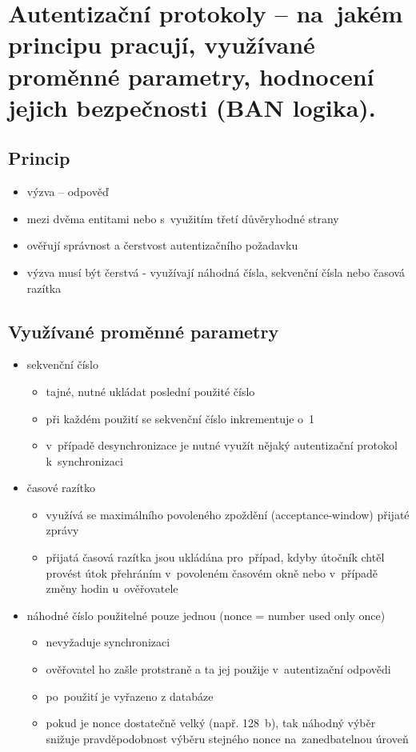 \clearpage
\section{Autentizační protokoly -- na~jakém principu pracují, využívané proměnné parametry, hodnocení jejich bezpečnosti (BAN logika).}

\subsection{Princip}
\begin{itemize}
    \item výzva -- odpověď
    \item mezi dvěma entitami nebo s~využitím třetí důvěryhodné strany
    \item ověřují správnost a čerstvost autentizačního požadavku
    \item výzva musí být čerstvá - využívají náhodná čísla, sekvenční čísla nebo časová razítka
\end{itemize}

\subsection{Využívané proměnné parametry}
\begin{itemize}
    \item sekvenční číslo
    \begin{itemize}
        \item tajné, nutné ukládat poslední použité číslo
        \item při každém použití se sekvenční číslo inkrementuje o~1
        \item v~případě desynchronizace je nutné využít nějaký autentizační protokol k~synchronizaci
    \end{itemize}
    \item časové razítko
    \begin{itemize}
        \item využívá se maximálního povoleného zpoždění (acceptance-window) přijaté zprávy
        \item přijatá časová razítka jsou ukládána pro~případ, kdyby útočník chtěl provést útok přehráním v~povoleném časovém okně nebo v~případě změny hodin u~ověřovatele
    \end{itemize}
    \item náhodné číslo použitelné pouze jednou (nonce = number used only once)
    \begin{itemize}
        \item nevyžaduje synchronizaci
        \item ověřovatel ho zašle protstraně a ta jej použije v~autentizační odpovědi
        \item po~použití je vyřazeno z databáze
        \item pokud je nonce dostatečně velký (např. 128~b), tak náhodný výběr snižuje pravděpodobnost výběru stejného nonce na~zanedbatelnou úroveň
    \end{itemize}
\end{itemize}

